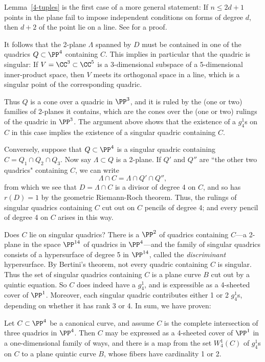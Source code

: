\begin{fact}
Lemma~\ref{4-tuples} is the first case of a more general statement: If $n\leq 2d+1$ points in the plane fail to impose independent conditions on forms of degree $d$, then $d+2$ of the point lie on a line. See \cite[p.***]{MR1376653} for a proof.
\end{fact}


 It follows that the 2-plane $\Lambda$ spanned by $D$ must be contained in one of the quadrics $Q \subset \PP^4$ containing $C$. This implies in particular that the quadric is singular: If $V = \CC^3\subset \CC^5$
is a  3-dimensional subspace of a 5-dimensional inner-product space, then $V$ meets its orthogonal space
in a line, which is a singular point of the corresponding quadric.
 
Thus $Q$ is a cone over a quadric in $\PP^3$, and it is ruled by the (one or two) families of 2-planes it contains, which are the cones over the (one or two) rulings of the quadric in $\PP^3$. The argument above shows that the existence of a $g_4^1$s on $C$ in this case implies the existence of a singular quadric containing $C$.

Conversely, suppose that $Q \subset \PP^4$ is a singular quadric containing $C = Q_1 \cap Q_2 \cap Q_3$. Now say $\Lambda \subset Q$ is  a 2-plane. If $Q'$ and $Q''$ are ``the other two quadrics" containing $C$, we can write
$$
\Lambda \cap C = \Lambda \cap Q' \cap Q'', 
$$ 
from which we see that $D = \Lambda \cap C$ is a divisor of degree 4 on $C$, and so has $r(D) = 1$ by the geometric Riemann-Roch theorem. Thus, the rulings of  singular quadrics containing $C$ cut out on $C$ pencils of degree 4; and every pencil of degree 4 on $C$ arises in this way.

Does $C$ lie on singular quadrics? There is a $\PP^2$ of quadrics containing $C$---a 2-plane in the space $\PP^{14}$ of quadrics in $\PP^4$---and the family of singular quadrics  consists of a  hypersurface of degree 5 in $\PP^{14}$, called the \emph{discriminant} hypersurface. By Bertini's theorem, not every quadric containing $C$ is singular. Thus the set of singular quadrics containing $C$ is a plane curve $B$ cut out by a quintic equation. So $C$ does indeed have a $g^1_4$, and is expressible as a 4-sheeted cover of $\PP^1$. Moreover, each singular quadric contributes either 1 or 2 $g^1_4$s, depending on whether it has rank 3 or 4. In sum, we have proven:

\begin{proposition}
Let $C \subset \PP^4$ be a canonical curve, and assume $C$ is the complete intersection of three quadrics in $\PP^4$. Then $C$ may be expressed as a 4-sheeted cover of $\PP^1$ in a one-dimensional family of ways, and there is a map from the set $W^1_4(C)$ of $g^1_4$s on $C$ to a plane quintic curve $B$, whose fibers have cardinality 1 or 2.
\end{proposition}

